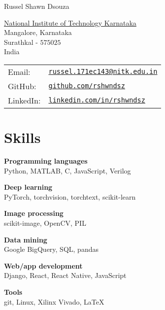 \documentclass[letterpaper]{article}
\def\name{Russel Shawn Dsouza}
\renewenvironment{itemize}{
  \begin{list}{}{
    \setlength{\leftmargin}{1.5em}
  }
}{
  \end{list}
}
\begin{document}
{\huge \name}


\vspace{0.25in}

\begin{minipage}{0.45\linewidth}
  \href{http://www.nitk.ac.in/}{National Institute of Technology Karnataka} \\
  Mangalore, Karnataka \\
  Surathkal - $575025$\\
  India
\end{minipage}


\hfill
\begin{minipage}{0.45\linewidth}
  \begin{tabular}{ll}
    Email: & \href{mailto:russel.171ec143@nitk.edu.in}{\tt russel.171ec143@nitk.edu.in} \\
    GitHub: & \href{https://www.github.com/rshwndsz}{\tt github.com/rshwndsz} \\
    LinkedIn: & \href{https://www.linkedin.com/in/rshwndsz}{\tt linkedin.com/in/rshwndsz}
  \end{tabular}
\end{minipage}


\section*{Skills}
  \begin{itemize}
    \item \textbf{Programming languages}\\
    Python, MATLAB, C, JavaScript, Verilog
    \item \textbf{Deep learning}\\
    PyTorch, torchvision, torchtext, scikit-learn
    \item \textbf{Image processing}\\
    scikit-image, OpenCV, PIL
    \item \textbf{Data mining}\\
    Google BigQuery, SQL, pandas
    \item \textbf{Web/app development}\\
    Django, React, React Native, JavaScript
    \item \textbf{Tools}\\
    git, Linux, Xilinx Vivado, \LaTeX
  \end{itemize}
\end{document}
